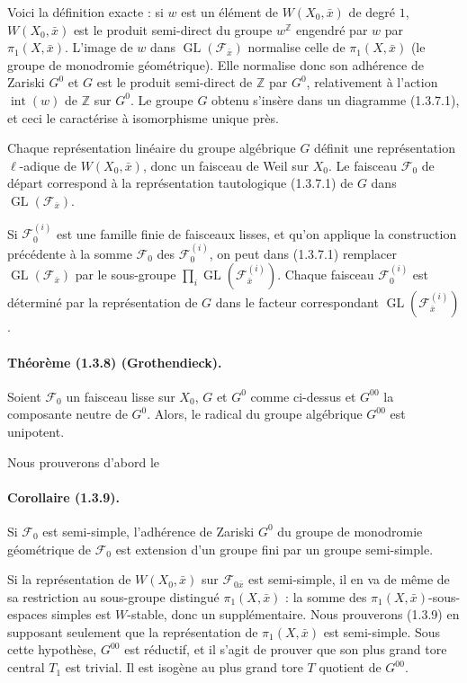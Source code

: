 \documentclass[11pt]{article}
\theoremstyle{remark}
\newcommand{\ZZ}{\mathbb{Z}}
\newcommand{\GL}{\operatorname{GL}}
\begin{document}
Voici la définition exacte : si $w$ est un élément de $W(X_0,\bar x)$ de degré $1$, $W(X_0,\bar x)$ est le produit semi-direct du groupe $w^{\ZZ}$ engendré par $w$ par $\pi_1(X,\bar x)$. L'image de $w$ dans $\GL(\mathcal F_{\bar x})$ normalise celle de $\pi_1(X,\bar x)$ (le groupe de monodromie géométrique). Elle normalise donc son adhérence de Zariski $G^0$ et $G$ est le produit semi-direct de $\ZZ$ par $G^0$, relativement à l'action $\operatorname{int}(w)$ de $\ZZ$ sur $G^0$. Le groupe $G$ obtenu s'insère dans un diagramme (1.3.7.1), et ceci le caractérise à isomorphisme unique près.

Chaque représentation linéaire du groupe algébrique $G$ définit une représentation $\ell$-adique de $W(X_0,\bar x)$, donc un faisceau de Weil sur $X_0$. Le faisceau $\mathcal F_0$ de départ correspond à la représentation tautologique (1.3.7.1) de $G$ dans $\GL(\mathcal F_{\bar x})$.

Si $\mathcal F_0^{(i)}$ est une famille finie de faisceaux lisses, et qu'on applique la construction précédente à la somme $\mathcal F_0$ des $\mathcal F_0^{(i)}$, on peut dans (1.3.7.1) remplacer $\GL(\mathcal F_{\bar x})$ par le sous-groupe $\prod_i\GL(\mathcal F_{\bar x}^{(i)})$. Chaque faisceau $\mathcal F_0^{(i)}$ est déterminé par la représentation de $G$ dans le facteur correspondant $\GL(\mathcal F_{\bar x}^{(i)})$.

\paragraph{Théorème (1.3.8) (Grothendieck).} Soient $\mathcal F_0$ un faisceau lisse sur $X_0$, $G$ et $G^0$ comme ci-dessus et $G^{00}$ la composante neutre de $G^0$. Alors, le radical du groupe algébrique $G^{00}$ est unipotent.

Nous prouverons d'abord le

\paragraph{Corollaire (1.3.9).} Si $\mathcal F_0$ est semi-simple, l'adhérence de Zariski $G^0$ du groupe de monodromie géométrique de $\mathcal F_0$ est extension d'un groupe fini par un groupe semi-simple.

Si la représentation de $W(X_0,\bar x)$ sur $\mathcal F_{0\bar x}$ est semi-simple, il en va de même de sa restriction au sous-groupe distingué $\pi_1(X,\bar x)$ : la somme des $\pi_1(X,\bar x)$-sous-espaces simples est $W$-stable, donc un supplémentaire. Nous prouverons (1.3.9) en supposant seulement que la représentation de $\pi_1(X,\bar x)$ est semi-simple. Sous cette hypothèse, $G^{00}$ est réductif, et il s'agit de prouver que son plus grand tore central $T_1$ est trivial. Il est isogène au plus grand tore $T$ quotient de $G^{00}$.
\end{document}
